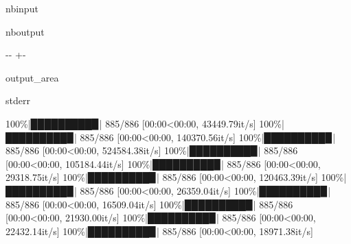 \documentclass[letterpaper,10pt,english]{sphinxmanual}
\begin{document}
\begin{sphinxuseclass}{nbinput}
{\begin{sphinxVerbatim}[commandchars=\\\{\}]
 
\end{sphinxVerbatim}
}

\end{sphinxuseclass}
\begin{sphinxuseclass}{nboutput}
{

\kern-\sphinxverbatimsmallskipamount\kern-\baselineskip
\kern+\FrameHeightAdjust\kern-\fboxrule
\vspace{\nbsphinxcodecellspacing}

\begin{sphinxuseclass}{output_area}
\begin{sphinxuseclass}{stderr}


\begin{sphinxVerbatim}[commandchars=\\\{\}]
100\%|█████████▉| 885/886 [00:00<00:00, 43449.79it/s]
100\%|█████████▉| 885/886 [00:00<00:00, 140370.56it/s]
100\%|█████████▉| 885/886 [00:00<00:00, 524584.38it/s]
100\%|█████████▉| 885/886 [00:00<00:00, 105184.44it/s]
100\%|█████████▉| 885/886 [00:00<00:00, 29318.75it/s]
100\%|█████████▉| 885/886 [00:00<00:00, 120463.39it/s]
100\%|█████████▉| 885/886 [00:00<00:00, 26359.04it/s]
100\%|█████████▉| 885/886 [00:00<00:00, 16509.04it/s]
100\%|█████████▉| 885/886 [00:00<00:00, 21930.00it/s]
100\%|█████████▉| 885/886 [00:00<00:00, 22432.14it/s]
100\%|█████████▉| 885/886 [00:00<00:00, 18971.38it/s]
\end{sphinxVerbatim}



\end{sphinxuseclass}
\end{sphinxuseclass}
}

\end{sphinxuseclass}
\end{document}
